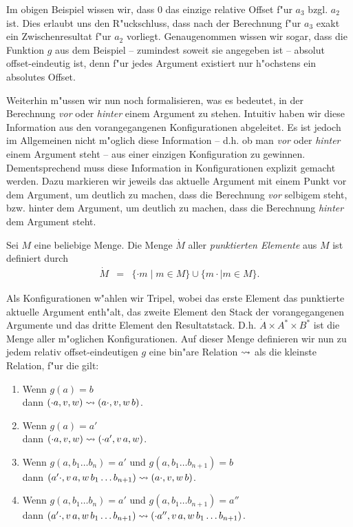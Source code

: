 \documentclass[12pt,a4paper]{article}
\begin{document}
Im obigen Beispiel wissen wir, dass $0$ das einzige relative Offset f"ur $a_3$ bzgl. $a_2$ ist. Dies
erlaubt uns den R"uckschluss, dass nach der Berechnung f"ur $a_3$ exakt ein Zwischenresultat f"ur
$a_2$ vorliegt. Genaugenommen wissen wir sogar, dass die Funktion $g$ aus dem Beispiel -- zumindest
soweit sie angegeben ist -- absolut offset-eindeutig ist, denn f"ur jedes Argument existiert
nur h"ochstens ein absolutes Offset.

Weiterhin m"ussen wir nun noch formalisieren, was es bedeutet, in der Berechnung \emph{vor} oder
\emph{hinter} einem Argument zu stehen. Intuitiv haben wir diese Information aus den vorangegangenen
Konfigurationen abgeleitet. Es ist jedoch im Allgemeinen nicht m"oglich diese Information -- d.h.
ob man \emph{vor} oder \emph{hinter} einem Argument steht -- aus einer einzigen Konfiguration zu
gewinnen. Dementsprechend muss diese Information in Konfigurationen explizit gemacht werden. Dazu
markieren wir jeweils das aktuelle Argument mit einem Punkt vor dem Argument, um deutlich zu machen,
dass die Berechnung \emph{vor} selbigem steht, bzw. hinter dem Argument, um deutlich zu machen, dass
die Berechnung \emph{hinter} dem Argument steht.

\begin{definition}
  Sei $M$ eine beliebige Menge. Die Menge $\dot{M}$ aller \emph{punktierten Elemente} aus
  $M$ ist definiert durch
  \[\begin{array}{rcl}
    \dot{M} &=& \{\cdot m \mid m \in M\} \cup \{m \cdot \mid m \in M\}.
  \end{array}\]
\end{definition}

Als Konfigurationen w"ahlen wir Tripel, wobei das erste Element das punktierte aktuelle Argument
enth"alt, das zweite Element den Stack der vorangegangenen Argumente und das dritte Element den
Resultatstack. D.h. $\dot{A} \times A^* \times B^*$ ist die Menge aller m"oglichen Konfigurationen.
Auf dieser Menge definieren wir nun zu jedem relativ offset-eindeutigen $g$ eine bin"are Relation
$\rightsquigarrow$ als die kleinste Relation, f"ur die gilt:
\begin{enumerate}
\item Wenn $g(a) = b$ \\
  dann $(\cdot a,v,w) \rightsquigarrow (a \cdot,v,w\,b)$.
\item Wenn $g(a) = a'$ \\
  dann $(\cdot a,v,w) \rightsquigarrow (\cdot a',v\,a,w)$.
\item Wenn $g(a,b_1 \ldots b_n) = a'$ und $g(a,b_1 \ldots b_{n+1}) = b$ \\
  dann $(a' \cdot,v\,a,w\,b_1 \ldots b_{n+1}) \rightsquigarrow (a \cdot,v,w\,b)$.
\item Wenn $g(a,b_1 \ldots b_n) = a'$ und $g(a,b_1 \ldots b_{n+1}) = a''$ \\
  dann $(a' \cdot,v\,a,w\,b_1 \ldots b_{n+1}) \rightsquigarrow (\cdot a'',v\,a,w\,b_1 \ldots b_{n+1})$.
\end{enumerate}
\end{document}
